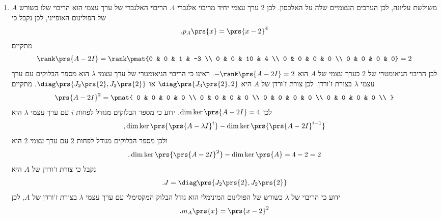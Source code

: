 \documentclass[a4paper,10pt,twoside,openany]{book}
\begin{document}
\begin{solution}
\begin{enumerate}
\item
$A$
משולשת עליונה, לכן הערכים העצמיים שלה על האלכסון. לכן
$2$
ערך עצמי יחיד מריבוי אלגברי
$4$.
הריבוי האלגברי של ערך עצמי הוא הריבוי שלו כשורש של הפולינום האופייני, לכן נקבל כי
\begin{align*}
\text{.} p_A\prs{x} = \prs{x-2}^4
\end{align*}
מתקיים
\begin{align*}
\rank\prs{A - 2I} = \rank\pmat{0 & 0 & 1 & -3 \\ 0 & 0 & 10 & 4 \\ 0 & 0 & 0 & 0 \\ 0 & 0 & 0 & 0} = 2
\end{align*}
לכן הריבוי הגיאומטרי של
$2$
כערך עצמי של
$A$
הוא
$ - \rank\prs{A - 2I} = 2$.
ראינו כי הריבוי הגיאומטרי של ערך עצמי
$\lambda$
הוא מספר הבלוקים עם ערך עצמי
$\lambda$
בצורת ז'ורדן. לכן צורת ז'ורדן של
$A$
היא
$\diag\prs{J_3\prs{2}, 2}$
או
$\diag\prs{J_2\prs{2}, J_2\prs{2}}$.
מתקיים
\begin{align*}
\prs{A - 2I}^2 = \pmat{
0 & 0 & 0 & 0 \\
0 & 0 & 0 & 0 \\
0 & 0 & 0 & 0 \\
0 & 0 & 0 & 0 \\
}
\end{align*}
לכן
$\dim \ker\prs{A - 2I} = 4$.
ידוע כי מספר הבלוקים מגודל לפחות
$i$
עם ערך עצמי
$\lambda$
הוא
\[ \text{,} \dim \ker\prs{\prs{A - \lambda I}^i} - \dim \ker\prs{\prs{A - 2I}^{i-1}}\]
ולכן מספר הבלוקים מגודל לפחות
$2$
עם ערך עצמי
$2$
הוא
\[\text{.} \dim \ker\prs{\prs{A - 2I}^2} - \dim \ker\prs{A} = 4 - 2 = 2\]
נקבל כי צורת ז'ורדן של
$A$
היא
\[\text{.} J = \diag\prs{J_2\prs{2}, J_2\prs{2}}\]
ידוע כי הריבוי של
$\lambda$
כשורש של הפולינום המינימלי הוא גודל הבלוק המקסימלי עם ערך עצמי
$\lambda$
בצורת ז'ורדן של
$A$,
לכן
\[\text{.} m_A\prs{x} = \prs{x-2}^2\]


\end{enumerate}
\end{solution}
\end{document}

